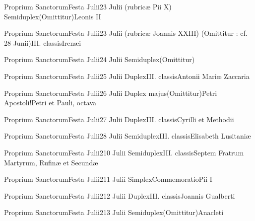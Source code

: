 \documentclass[invitatoriale-romanum.tex]{subfiles}
\begin{document}
	{Proprium Sanctorum}{Festa Julii}{2}{3 Julii (rubricæ Pii X)}
	{Semiduplex}{(Omittitur)}{Leonis II}
	{}
	{}

	{Proprium Sanctorum}{Festa Julii}{2}{3 Julii (rubricæ Joannis XXIII)}
	{(Omittitur : cf. 28 Junii)}{III. classis}{Irenæi}
	{}
	{}

	{Proprium Sanctorum}{Festa Julii}{2}{4 Julii}
	{Semiduplex}{(Omittitur)}{}
	{}
	{\invitferia}

	{Proprium Sanctorum}{Festa Julii}{2}{5 Julii}
	{Duplex}{III. classis}{Antonii Mariæ Zaccaria}
	{}
	{}

	{Proprium Sanctorum}{Festa Julii}{2}{6 Julii}
	{Duplex majus}{(Omittitur)}{Petri Apostoli!Petri et Pauli, octava}
	{}
	{\invitferia}

	{Proprium Sanctorum}{Festa Julii}{2}{7 Julii}
	{Duplex}{III. classis}{Cyrilli et Methodii}
	{}
	{}

	{Proprium Sanctorum}{Festa Julii}{2}{8 Julii}
	{Semiduplex}{III. classis}{Elisabeth Lusitaniæ}
	{}
	{}

	{Proprium Sanctorum}{Festa Julii}{2}{10 Julii}
	{Semiduplex}{III. classis}{Septem Fratrum Martyrum, Rufinæ et Secundæ}
	{}
	{}

	{Proprium Sanctorum}{Festa Julii}{2}{11 Julii}
	{Simplex}{Commemoratio}{Pii I}
	{}
	{\invitferia}


	{Proprium Sanctorum}{Festa Julii}{2}{12 Julii}
	{Duplex}{III. classis}{Joannis Gualberti}
	{}
	{}

	{Proprium Sanctorum}{Festa Julii}{2}{13 Julii}
	{Semiduplex}{(Omittitur)}{Anacleti}
	{}
	{\invitferia}
\end{document}
